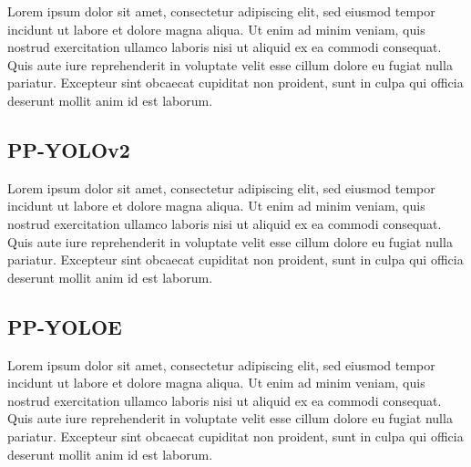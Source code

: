 \documentclass{article}
\begin{document}
Lorem ipsum dolor sit amet, consectetur adipiscing elit, sed eiusmod tempor incidunt ut labore et dolore magna aliqua. Ut enim ad minim veniam, quis nostrud exercitation ullamco laboris nisi ut aliquid ex ea commodi consequat. Quis aute iure reprehenderit in voluptate velit esse cillum dolore eu fugiat nulla pariatur. Excepteur sint obcaecat cupiditat non proident, sunt in culpa qui officia deserunt mollit anim id est laborum.

\subsection{PP-YOLOv2}



Lorem ipsum dolor sit amet, consectetur adipiscing elit, sed eiusmod tempor incidunt ut labore et dolore magna aliqua. Ut enim ad minim veniam, quis nostrud exercitation ullamco laboris nisi ut aliquid ex ea commodi consequat. Quis aute iure reprehenderit in voluptate velit esse cillum dolore eu fugiat nulla pariatur. Excepteur sint obcaecat cupiditat non proident, sunt in culpa qui officia deserunt mollit anim id est laborum.


\subsection{PP-YOLOE}



Lorem ipsum dolor sit amet, consectetur adipiscing elit, sed eiusmod tempor incidunt ut labore et dolore magna aliqua. Ut enim ad minim veniam, quis nostrud exercitation ullamco laboris nisi ut aliquid ex ea commodi consequat. Quis aute iure reprehenderit in voluptate velit esse cillum dolore eu fugiat nulla pariatur. Excepteur sint obcaecat cupiditat non proident, sunt in culpa qui officia deserunt mollit anim id est laborum.




\end{document}

